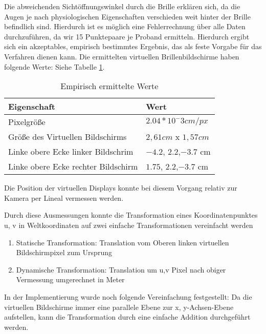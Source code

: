 Die abweichenden Sichtöffnungswinkel durch die Brille erklären sich, da die Augen je nach physiologischen Eigenschaften verschieden weit hinter der Brille befindlich sind. 
Hierdurch ist es möglich eine Fehlerrechnung über alle Daten durchzuführen, da wir 15 Punktepaare je Proband ermitteln. 
Hierdurch ergibt sich ein akzeptables, empirisch bestimmtes Ergebnis, das als feste Vorgabe für das Verfahren dienen kann.
Die ermittelten virtuellen Brillenbildschirme haben folgende Werte: Siehe Tabelle \ref{tab:konstanteWerte}.
\begin{table}[h]
 \begin{tabular}{l|l}
  Eigenschaft & Wert \\
  \hline
  \hline
  Pixelgröße & $2.04*10^-3 cm/px$ \\
  Größe des Virtuellen Bildschirms & $2,61 cm$ x $1,57 cm$ \\
  Linke obere Ecke linker Bildschrim & $-4.2$, $2.2$,$-3.7$ cm \\
  Linke obere Ecke rechter Bildschirm &  $1.75$, $2.2$,$-3.7$ cm \\
 \end{tabular}
 \label{tab:konstanteWerte}
 \caption{Empirisch ermittelte Werte}
 \end{table}
Die Position der virtuellen Displays konnte bei diesem Vorgang relativ zur Kamera per Lineal vermessen werden.

 
Durch diese Ausmessungen konnte die  Transformation eines Koordinatenpunktes u, v in Weltkoordinaten auf zwei einfache Transformationen vereinfacht werden

   \begin{enumerate}
      \item Statische Transformation: Translation vom Oberen linken virtuellen Bildschirmpixel zum Ursprung
      \item Dynamische Transformation: Translation um u,v Pixel nach obiger Vermessung umgerechnet in Meter
   \end{enumerate}


In der Implementierung wurde noch folgende Vereinfachung festgestellt: Da die virtuellen Bildschirme immer eine parallele Ebene zur x, y-Achsen-Ebene aufstellen, kann die Transformation durch eine einfache Addition durchgeführt werden.

